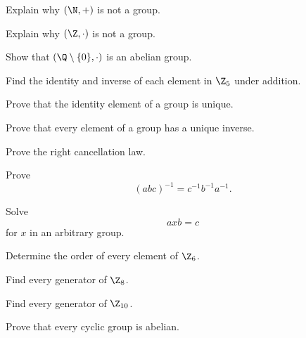 \begin{exercise}[1]
Explain why \((\N,+)\) is not a group.
\end{exercise}

\begin{exercise}[1]
Explain why \((\Z,\cdot)\) is not a group.
\end{exercise}

\begin{exercise}[1]
Show that \((\Q\setminus\{0\},\cdot)\) is an abelian group.
\end{exercise}

\begin{exercise}[1]
Find the identity and inverse of each element in \(\Z_5\) under addition.
\end{exercise}

\begin{exercise}[2]
Prove that the identity element of a group is unique.
\end{exercise}

\begin{exercise}[2]
Prove that every element of a group has a unique inverse.
\end{exercise}

\begin{exercise}[2]
Prove the right cancellation law.
\end{exercise}

\begin{exercise}[2]
Prove
\[ (abc)^{-1}=c^{-1}b^{-1}a^{-1}. \]
\end{exercise}

\begin{exercise}[2]
Solve
\[ axb=c \]
for \(x\) in an arbitrary group.
\end{exercise}

\begin{exercise}[1]
Determine the order of every element of \(\Z_6\).
\end{exercise}

\begin{exercise}[2]
Find every generator of \(\Z_8\).
\end{exercise}

\begin{exercise}[2]
Find every generator of \(\Z_{10}\).
\end{exercise}

\begin{exercise}[2]
Prove that every cyclic group is abelian.
\end{exercise}

